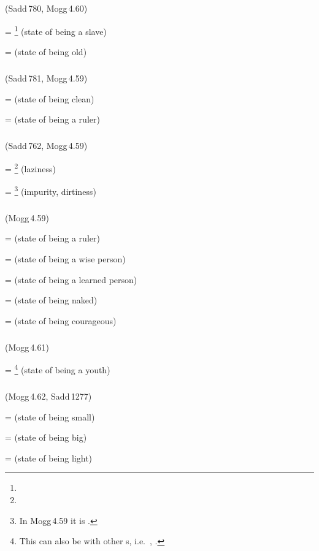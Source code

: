 \subparagraph*{} (Sadd\,780, Mogg\,4.60)\label{pacct8:bya}

 = \footnote{} (state of being a slave) \par
{} =  (state of being old) \par

\subparagraph*{} (Sadd\,781, Mogg\,4.59)\label{pacct8:dneyya}

 =  (state of being clean) \par
{} =  (state of being a ruler) \par

\subparagraph*{} (Sadd\,762, Mogg\,4.59)\label{pacct8:dniya}

 = \footnote{} (laziness) \par
{} = \footnote{In Mogg\,4.59 it is .} (impurity, dirtiness) \par

\subparagraph*{} (Mogg\,4.59)\label{pacct8:iya}

 =  (state of being a ruler) \par
{} =  (state of being a wise person) \par
{} =  (state of being a learned person) \par
{} =  (state of being naked) \par
{} =  (state of being courageous) \par

\subparagraph*{} (Mogg\,4.61)\label{pacct8:nadna}

 = \footnote{This can also be with other s, i.e.\ , .} (state of being a youth) \par

\subparagraph*{} (Mogg\,4.62, Sadd\,1277)\label{pacct8:ima}

 =  (state of being small) \par
{} =  (state of being big) \par
{} =  (state of being light) \par


